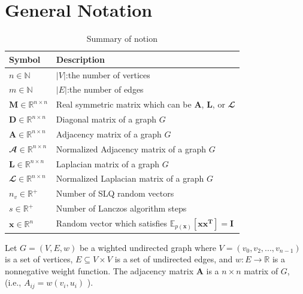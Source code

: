 \documentclass[senior,final,11pt]{iscs-thesis}
\begin{document}
\section{General Notation}
\begin{table}[htb]
  \begin{center}
    \begin{tabular}{l l}
      \bf{Symbol} & \bf{Description} \\ \hline
      $n \in \mathbb{N}$ & $|V|$:the number of vertices \\
      $m \in \mathbb{N}$ & $|E|$:the number of edges \\ \hline
      ${\mathbf M} \in \mathbb{R}^{n\times n}$ & Real symmetric matrix which can be ${\mathbf A}$, ${\mathbf L}$, or ${\mathbfcal L}$\\
      ${\mathbf D} \in \mathbb{R}^{n\times n}$ & Diagonal matrix of a graph $G$ \\
      ${\mathbf A} \in \mathbb{R}^{n\times n}$ & Adjacency matrix of a graph $G$ \\
      ${\mathbfcal A} \in \mathbb{R}^{n\times n}$ & Normalized Adjacency matrix of a graph $G$ \\
      ${\mathbf L} \in \mathbb{R}^{n\times n}$ & Laplacian matrix of a graph $G$ \\
      ${\mathbfcal L} \in \mathbb{R}^{n\times n}$ & Normalized Laplacian matrix of a graph $G$ \\
      \hline
      $n_v \in \mathbb{R}^+$ & Number of SLQ random vectors \\
      $s \in \mathbb{R}^+$ & Number of Lanczos algorithm steps\\
      ${\mathbf x} \in \mathbb{R}^n$ & Random vector which satisfies $\mathbb{E}_{p(\mathbf{x})}[\mathbf{xx^T}] = \mathbf{I}$\\
      \hline
    \end{tabular}
    \caption{Summary of notion}
    \label{tab:notion}
  \end{center}
\end{table}

Let $G=(V,E,w)$ be a wighted undirected graph where $V=(v_0, v_2, ..., v_{n-1})$ is a set of vertices, $E \subseteq V\times V$ is a set of undirected edges, and $w: E \rightarrow \mathbb{R}$ is a nonnegative weight function. The adjacency matrix ${\mathbf A}$ is a $n \times n$ matrix of $G$, (i.e., $ A_{ij}= w(v_i ,u_i)$ ).
\end{document}
